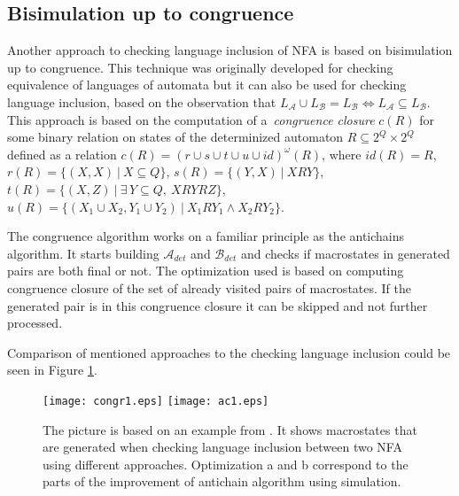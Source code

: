\documentclass{eeict}
\begin{document}
\subsection{Bisimulation up to congruence}
Another approach to checking language inclusion of NFA is based on bisimulation up to congruence. This technique was originally developed for
checking equivalence of languages of automata but it can
also be used for checking language inclusion, based on the observation that $L_\mathcal{A}\cup L_\mathcal{B}= L_\mathcal{B} 
\Leftrightarrow L_\mathcal{A}\subseteq L_\mathcal{B}$. 
This approach is based on the computation of a~\emph{congruence closure} $c(R)$ 
for some binary relation on states of the determinized automaton $R \subseteq 2^Q\times 2^Q$ defined 
as a relation $c(R)=(r\cup s\cup t \cup u\cup id)^{\omega}(R)$, where $id(R)=R$, 
$r(R)=\{(X,X)\ |\ X\subseteq Q\}$, %
$s(R)=\{(Y,X)\ |\ XRY\}$,\linebreak
$t(R)=\{(X,Z)\ |\ \exists\,Y\subseteq Q,\ XRYRZ\}$,
$u(R)=\{(X_1 \cup X_2,Y_1\cup Y_2)\ |\ X_1 R Y_1 \wedge X_2 R Y_2\}$. %

The congruence algorithm works on a familiar principle as the antichains algorithm. 
It starts building $\mathcal{A}_{det}$ and $\mathcal{B}_{det}$ and checks if macrostates in generated pairs are both
final or not. The optimization used is based on computing congruence closure of the set of already visited pairs of macrostates. 
If the generated pair is in this congruence closure it can be skipped and not further processed.

Comparison of mentioned approaches to the checking language inclusion could be seen in Figure \ref{automata}.
\begin{figure}[bht]
\begin{center}
	\scalebox{1}
	{
		\texttt{[image: congr1.eps]}
		\hspace{0.5cm}
  	\texttt{[image: ac1.eps]}
	}
  \caption{
      \rm{
      \hspace{0.1cm} The picture is based on an example from \cite{tacas10}. It shows macrostates 
			that are generated when checking language inclusion between two NFA using different approaches. Optimization a and b
			correspond to the parts of the improvement of antichain algorithm using simulation.}}
  \label{automata}
\end{center}
\end{figure}
\end{document}
